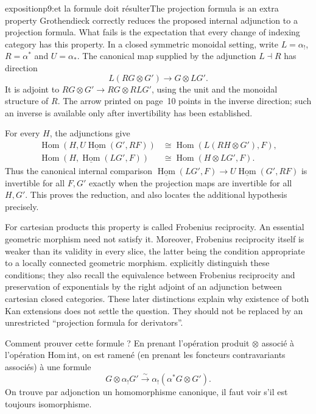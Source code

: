 \begin{dcomment}{exposition}{p9:et la formule doit résulter}{The projection formula is an extra property}
Grothendieck correctly reduces the proposed internal adjunction to a projection formula. What fails is the expectation that every change of indexing category has this property. In a closed symmetric monoidal setting, write $L=\alpha_!$, $R=\alpha^*$ and $U=\alpha_*$. The canonical map supplied by the adjunction $L\dashv R$ has direction
\[
 L(RG\otimes G')\longrightarrow G\otimes LG'.
\]
It is adjoint to $RG\otimes G'\to RG\otimes RLG'$, using the unit and the monoidal structure of $R$. The arrow printed on page~10 points in the inverse direction; such an inverse is available only after invertibility has been established.

For every $H$, the adjunctions give
\[
\begin{aligned}
 \operatorname{Hom}(H,U\underline{\operatorname{Hom}}(G',RF))
 &\cong\operatorname{Hom}(L(RH\otimes G'),F),\\
 \operatorname{Hom}(H,\underline{\operatorname{Hom}}(LG',F))
 &\cong\operatorname{Hom}(H\otimes LG',F).
\end{aligned}
\]
Thus the canonical internal comparison
$\underline{\operatorname{Hom}}(LG',F)\to
U\underline{\operatorname{Hom}}(G',RF)$
is invertible for all $F,G'$ exactly when the projection maps are invertible for all $H,G'$. This proves the reduction, and also locates the additional hypothesis precisely.

For cartesian products this property is called Frobenius reciprocity. An essential geometric morphism need not satisfy it. Moreover, Frobenius reciprocity itself is weaker than its validity in every slice, the latter being the condition appropriate to a locally connected geometric morphism. \citet[\S1]{GarnerStreicher2021} explicitly distinguish these conditions; they also recall the equivalence between Frobenius reciprocity and preservation of exponentials by the right adjoint of an adjunction between cartesian closed categories. These later distinctions explain why existence of both Kan extensions does not settle the question. They should not be replaced by an unrestricted ``projection formula for derivators''.
\end{dcomment}


Comment prouver cette formule ? En prenant l'opération produit $\otimes$ associé à l'opération Hom\,int, on est ramené (en prenant les foncteurs contravariants associés) à une formule
\[ G \otimes \alpha_!G' \xrightarrow{\ \sim\ } \alpha_!(\alpha^*G \otimes G'). \]
On trouve par adjonction un homomorphisme canonique, il faut voir s'il est toujours isomorphisme.

